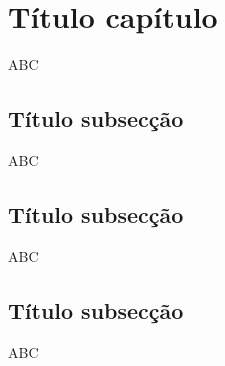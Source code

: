 \section{Título capítulo}
ABC 

\subsection{Título subsecção}
ABC

\subsection{Título subsecção}
    
ABC

\subsection{Título subsecção}

ABC
